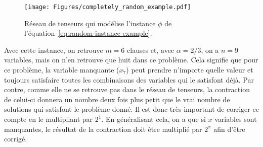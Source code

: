 \begin{figure}[h]
    \centering
    \texttt{[image: Figures/completely\_random\_example.pdf]}
    \caption{Réseau de tenseurs qui modélise l'instance $\phi$ de l'équation~\ref{eq:random-instance-example}.}
    \label{fig:random-instance-example}
\end{figure}
Avec cette instance, on retrouve $m = 6$ clauses et, avec $\alpha = 2/3$, on a $n = 9$ variables, mais on n'en retrouve que huit dans ce problème.
Cela signifie que pour ce problème, la variable manquante ($x_7$) peut prendre n'importe quelle valeur et toujours satisfaire toutes les combinaisons des variables qui le satisfont déjà.
Par contre, comme elle ne se retrouve pas dans le réseau de tenseurs, la contraction de celui-ci donnera un nombre deux fois plus petit que le vrai nombre de solutions qui satisfont le problème donné.
Il est donc très important de corriger ce compte en le multipliant par $2^1$.
En généralisant cela, on a que si $x$ variables sont manquantes, le résultat de la contraction doit être multiplié par $2^x$ afin d'être corrigé.


